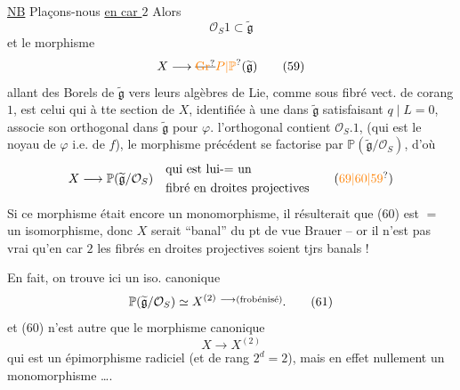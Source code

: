  \uline{NB} Plaçons-nous \uline{en car $2$} Alors
\[
\mathcal O_S1\subset\widetilde{\mathfrak g}\tag*{(58)}
\]
et le  morphisme
\[
X\longrightarrow\deleted{\unsure{\mathrm{Gr}}}\unsure{P|\mathbb P}(\widetilde{\mathfrak g})\tag*{(59)}
\]
allant des Borels de $\widetilde{\mathfrak g}$ vers leurs algèbres de Lie,  comme sous fibré vect. de corang $1$, est celui qui à tte section de $X$, identifiée à une    dans $\widetilde{\mathfrak g}$ satisfaisant $q\mid L=0$, associe son orthogonal dans $\widetilde{\mathfrak g}$ pour $\varphi$.   l'orthogonal contient $\mathcal O_S.1$, (qui est le noyau de $\varphi$ \unsure{\}|,} i.e. de $f$),  le morphisme précédent se factorise par
$\mathbb P(\widetilde{\mathfrak g}/\mathcal O_S)$,  d'où
\[
X\longrightarrow\mathbb P(\widetilde{\mathfrak g}/\mathcal O_S)\quad
\begin{aligned}&\text{qui est lui-$=$ un}\\&\text{fibré en droites projectives}\end{aligned}\tag*{(\unsure{69|60|59})}
\]
Si  ce morphisme  était encore un monomorphisme, il  résulterait que (60) est $=$ un isomorphisme, donc $X$ serait ``banal'' du pt de vue Brauer -- or il n'est pas vrai qu'en car $2$ les fibrés en droites projectives soient tjrs banals !

En fait, on trouve ici un iso. canonique
\[
\mathbb P(\widetilde{\mathfrak g}/\mathcal O_S)\simeq X^{(2)}\;\raisebox{.65ex}{\(\scriptstyle\longrightarrow\text{(frobénisé)}\)}.\tag*{(61)}
\]
et (60) n'est autre que le morphisme canonique
\[
X\longrightarrow X^{(2)}
\]
qui est un épimorphisme radiciel (et   de rang $2^d=2$), mais en effet nullement un monomorphisme \ldots.
